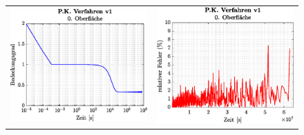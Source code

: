 \documentclass{listhesis}
\begin{document}
\begin{figure}[!h]
\begin{tabular}{@{}cc@{}}
\includegraphics[width=\ws\textwidth]{./include/figure_2.0/PC_current/CovFacet0.eps}&
\includegraphics[width=\ws\textwidth]{./include/figure_2.0/PC_current/CovFacetError0.eps}\\

\end{tabular}
\end{figure}
\end{document}
